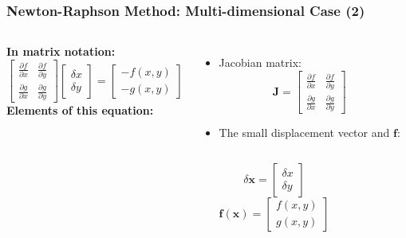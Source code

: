 \begin{frame}[fragile]
    \frametitle{Newton-Raphson Method: Multi-dimensional Case (2)}

    \begin{columns}
    \textbf{In matrix notation:}
    \[
        \begin{bmatrix}
            \frac{\partial f}{\partial x} & \frac{\partial f}{\partial y} \\
            \frac{\partial g}{\partial x} & \frac{\partial g}{\partial y}
        \end{bmatrix}
        \begin{bmatrix}
            \delta x \\
            \delta y
        \end{bmatrix}
        =
        \begin{bmatrix}
            -f(x, y) \\
            -g(x, y)
        \end{bmatrix}
    \]
    \textbf{Elements of this equation:}
    \begin{itemize}
        \item Jacobian matrix:
        \[
            \mathbf{J} = 
            \begin{bmatrix}
                \frac{\partial f}{\partial x} & \frac{\partial f}{\partial y} \\
                \frac{\partial g}{\partial x} & \frac{\partial g}{\partial y}
            \end{bmatrix}
        \]
        \item The small displacement vector and $\mathbf{f}$:
        \begin{columns}
          \[
              \delta \mathbf{x} = 
              \begin{bmatrix}
                \delta x \\
                \delta y
              \end{bmatrix}
          \]
          \[
            \mathbf{f}(\mathbf{x})=
            \begin{bmatrix}
              f(x,y) \\
              g(x,y)
            \end{bmatrix}
            \]
        \end{columns}
    \end{itemize}

\end{columns}
\end{frame}
